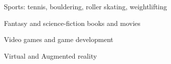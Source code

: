 \vspace{-3.7mm}


\begin{cventries}

{\fontsize{8pt}{1em}\bodyfont\scshape\color{graytext} \begin{cvitems}
\item Sports: tennis, bouldering, roller skating, weightlifting
\item Fantasy and science-fiction books and movies
\item Video games and game development
\item Virtual and Augmented reality
\end{cvitems}}

\end{cventries}
